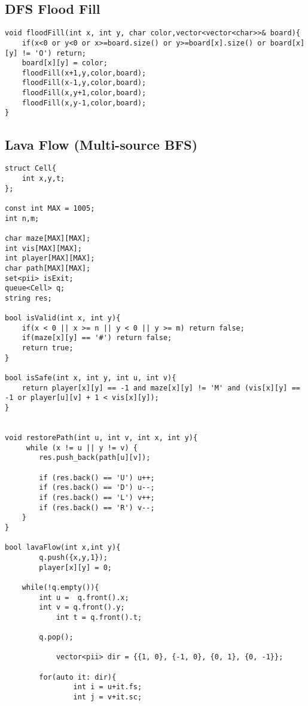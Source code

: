 \documentclass[10pt]{article}
\begin{document}
\begin{multicols*}{2}
\subsection{DFS Flood Fill}

\begin{lstlisting}[style=compactcpp]
void floodFill(int x, int y, char color,vector<vector<char>>& board){
    if(x<0 or y<0 or x>=board.size() or y>=board[x].size() or board[x][y] != 'O') return;
    board[x][y] = color;
    floodFill(x+1,y,color,board);
    floodFill(x-1,y,color,board);
    floodFill(x,y+1,color,board);
    floodFill(x,y-1,color,board);
}
\end{lstlisting}

\subsection{Lava Flow (Multi-source BFS)}

\begin{lstlisting}[style=compactcpp]
    struct Cell{
    int x,y,t;
};
 
const int MAX = 1005;
int n,m;
 
char maze[MAX][MAX];
int vis[MAX][MAX];
int player[MAX][MAX];
char path[MAX][MAX];
set<pii> isExit;
queue<Cell> q;
string res;
 
bool isValid(int x, int y){
    if(x < 0 || x >= n || y < 0 || y >= m) return false;
    if(maze[x][y] == '#') return false;
    return true;
}

bool isSafe(int x, int y, int u, int v){
    return player[x][y] == -1 and maze[x][y] != 'M' and (vis[x][y] == -1 or player[u][v] + 1 < vis[x][y]);
}


void restorePath(int u, int v, int x, int y){
	 while (x != u || y != v) {
        res.push_back(path[u][v]);

        if (res.back() == 'U') u++;
        if (res.back() == 'D') u--;
        if (res.back() == 'L') v++;
        if (res.back() == 'R') v--;
    }
}
 
bool lavaFlow(int x,int y){
        q.push({x,y,1});
        player[x][y] = 0;

	while(!q.empty()){
		int u =  q.front().x;
		int v = q.front().y;
            int t = q.front().t;

		q.pop();

            vector<pii> dir = {{1, 0}, {-1, 0}, {0, 1}, {0, -1}};
     
    	for(auto it: dir){
                int i = u+it.fs;
                int j = v+it.sc;
    

\end{lstlisting}
\end{multicols*}
\end{document}
